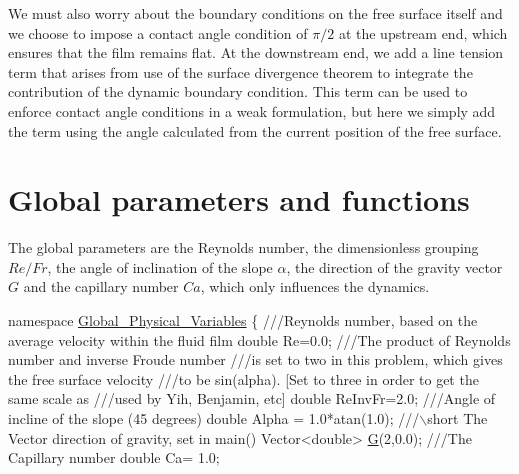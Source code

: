 We must also worry about the boundary conditions on the free surface itself and we choose to impose a contact angle condition of $ \pi/2 $ at the upstream end, which ensures that the film remains flat. At the downstream end, we add a line tension term that arises from use of the surface divergence theorem to integrate the contribution of the dynamic boundary condition. This term can be used to enforce contact angle conditions in a weak formulation, but here we simply add the term using the angle calculated from the current position of the free surface.



 

\hypertarget{index_global}{}\section{Global parameters and functions}\label{index_global}
The global parameters are the Reynolds number, the dimensionless grouping $Re/Fr$, the angle of inclination of the slope $\alpha$, the direction of the gravity vector $G$ and the capillary number $Ca$, which only influences the dynamics.

 
\begin{DoxyCodeInclude}
\textcolor{keyword}{namespace }\hyperlink{namespaceGlobal__Physical__Variables}{Global\_Physical\_Variables}
\{\textcolor{comment}{}
\textcolor{comment}{ ///Reynolds number, based on the average velocity within the fluid film}
\textcolor{comment}{} \textcolor{keywordtype}{double} Re=0.0;
\textcolor{comment}{}
\textcolor{comment}{ ///The product of Reynolds number and inverse Froude number }
\textcolor{comment}{ ///is set to two in this problem, which gives the free surface velocity}
\textcolor{comment}{ ///to be sin(alpha). [Set to three in order to get the same scale as }
\textcolor{comment}{ ///used by Yih, Benjamin, etc]}
\textcolor{comment}{} \textcolor{keywordtype}{double} ReInvFr=2.0;
\textcolor{comment}{}
\textcolor{comment}{ ///Angle of incline of the slope (45 degrees)}
\textcolor{comment}{} \textcolor{keywordtype}{double} Alpha = 1.0*atan(1.0);
\textcolor{comment}{}
\textcolor{comment}{ ///\(\backslash\)short The Vector direction of gravity, set in main()}
\textcolor{comment}{} Vector<double> \hyperlink{namespaceGlobal__Physical__Variables_aa868968dead376240a69f9152bd599b9}{G}(2,0.0);
\textcolor{comment}{}
\textcolor{comment}{ ///The Capillary number}
\textcolor{comment}{} \textcolor{keywordtype}{double} Ca= 1.0;

\end{DoxyCodeInclude}



